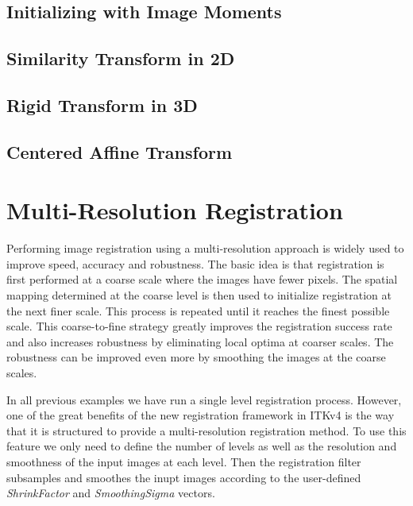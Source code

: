 \subsection{Initializing with Image Moments}
\label{sec:InitializingRegistrationWithMoments}
\ifitkFullVersion

\fi



\subsection{Similarity Transform in 2D}
\label{sec:SimilarityRegistrationIn2D}
\ifitkFullVersion

\fi



\subsection{Rigid Transform in 3D}
\label{sec:RigidRegistrationIn3D}
\ifitkFullVersion

\fi




\subsection{Centered Affine Transform}
\label{sec:CenteredAffineTransform}
\ifitkFullVersion

\fi




\section{Multi-Resolution Registration}
\label{sec:MultiResolutionRegistration}
Performing image registration using a multi-resolution approach is widely used
to improve speed, accuracy and robustness. The basic idea is that registration
is first performed at a coarse scale where the images have fewer pixels.
The spatial mapping determined at the coarse level is then used to initialize
registration at the next finer scale. This process is repeated until it
reaches the finest possible scale. This coarse-to-fine strategy greatly
improves the registration success rate and also increases robustness
by eliminating local optima at coarser scales. The robustness can be improved
even more by smoothing the images at the coarse scales.

In all previous examples we have run a single level registration process. However,
one of the great benefits of the new registration framework in ITKv4 is the way
that it is structured to provide a multi-resolution registration method.
To use this feature we only need to define the number of levels as well as the
resolution and smoothness of the input images at each level. Then the registration filter
subsamples and smoothes the inupt images according to the user-defined \emph{ShrinkFactor}
and \emph{SmoothingSigma} vectors.

